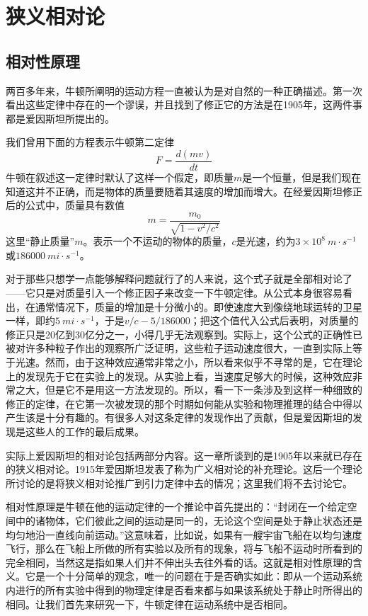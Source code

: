 \chapter{狭义相对论}

\section{相对性原理}

两百多年来，牛顿所阐明的运动方程一直被认为是对自然的一种正确描述。第一次看出这些定律中存在的一个谬误，并且找到了修正它的方法是在1905年，这两件事都是爱因斯坦所提出的。

我们曾用下面的方程表示牛顿第二定律
\begin{equation*}
    F=\frac{d(mv)}{dt}
\end{equation*}
牛顿在叙述这一定律时默认了这样一个假定，即质量$m$是一个恒量，但是我们现在知道这并不正确，而是物体的质量要随着其速度的增加而增大。在经爱因斯坦修正后的公式中，质量具有数值
\begin{equation}
    \label{Eq:I:15:1}
    m=\frac{m_0}{\sqrt{1-v^2/c^2}}
\end{equation}
这里“静止质量”$m$。表示一个不运动的物体的质量，$c$是光速，约为$3 \times 10^8~m \cdot s^{-1}$或$186000~mi \cdot s^{-1}$。

对于那些只想学一点能够解释问题就行了的人来说，这个式子就是全部相对论了——它只是对质量引入一个修正因子来改变一下牛顿定律。从公式本身很容易看出，在通常情况下，质量的增加是十分微小的。即使速度大到像绕地球运转的卫星一样，即约$5~mi \cdot s^{-1}$，于是$v/c-5/186000$；把这个值代入公式后表明，对质量的修正只是20亿到30亿分之一，小得几乎无法观察到。实际上，这个公式的正确性已被对许多种粒子作出的观察所广泛证明，这些粒子运动速度很大，一直到实际上等于光速。然而，由于这种效应通常非常之小，所以看来似乎不寻常的是，它在理论上的发现先于它在实验上的发现。从实验上看，当速度足够大的时候，这种效应非常之大，但是它不是用这一方法发现的。所以，看一下一条涉及到这样一种细致的修正的定律，在它第一次被发现的那个时期如何能从实验和物理推理的结合中得以产生该是十分有趣的。有很多人对这条定律的发现作出了贡献，但是爱因斯坦的发现是这些人的工作的最后成果。

实际上爱因斯坦的相对论包括两部分内容。这一章所谈到的是1905年以来就已存在的狭义相对论。1915年爱因斯坦发表了称为广义相对论的补充理论。这后一个理论所讨论的是将狭义相对论推广到引力定律中去的情况；这里我们将不去讨论它。

相对性原理是牛顿在他的运动定律的一个推论中首先提出的：“封闭在一个给定空间中的诸物体，它们彼此之间的运动是同一的，无论这个空间是处于静止状态还是均匀地沿一直线向前运动。”这意味着，比如说，如果有一艘宇宙飞船在以均匀速度飞行，那么在飞船上所做的所有实验以及所有的现象，将与飞船不运动时所看到的完全相同，当然这是指如果人们并不伸出头去往外看的话。这就是相对性原理的含义。它是一个十分简单的观念，唯一的问题在于是否确实如此：即从一个运动系统内进行的所有实验中得到的物理定律是否看来都与如果该系统处于静止时所得出的相同。让我们首先来研究一下，牛顿定律在运动系统中是否相同。

